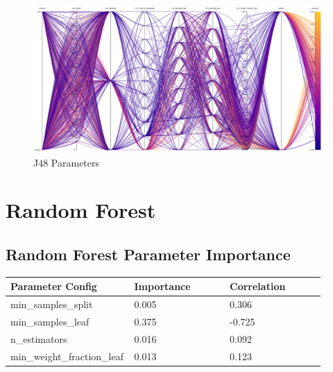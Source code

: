 \documentclass[11pt]{article}
\begin{document}
\begin{figure}[h]
  \caption {J48 Parameters} \label{ParallelCoordJ48}
  \centering 
  \includegraphics[width = \textwidth, height = \textwidth, keepaspectratio]{Images/J48 ParallelCoordGraph.png}
\end{figure}



\FloatBarrier
\newpage
\section{Random Forest}

\subsection{Random Forest Parameter Importance}
  \begin{table}[ht]
    \centering
    \begin{tabular}{|p{0.3\linewidth} | p{0.3\linewidth}| p{0.3\linewidth}|} 
      \hline
      \textbf{Parameter Config}  & \textbf{Importance} & \textbf{Correlation} \\ \hline
        min\_samples\_split & 0.005 & 0.306 \\ \hline
        min\_samples\_leaf & 0.375 & -0.725 \\ \hline
        n\_estimators & 0.016 & 0.092 \\ \hline
        min\_weight\_fraction\_leaf & 0.013 & 0.123 \\ \hline
    \end{tabular}
  \end{table}\label{RF_ParamImp1}
\end{document}

